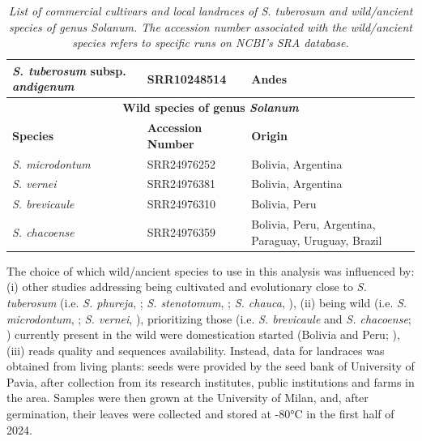 \documentclass[a4paper, 12pt]{report}
\begin{document}
\begin{table}[h!]
{\begin{tabular}{lll}
			\textit{S. tuberosum} subsp. \textit{andigenum} & SRR10248514 & Andes \\
			\midrule
			\multicolumn{3}{c}{\textbf{Wild species of genus \textit{Solanum}}} \\
			\midrule
			\textbf{Species} & \textbf{Accession Number} & \textbf{Origin} \\
			\midrule
			\textit{S. microdontum} & SRR24976252 & Bolivia, Argentina \\
			\textit{S. vernei} & SRR24976381 & Bolivia, Argentina \\
			\textit{S. brevicaule} & SRR24976310 & Bolivia, Peru \\
			\textit{S. chacoense} & SRR24976359 & Bolivia, Peru, Argentina, Paraguay, Uruguay, Brazil \\
			\bottomrule
		\end{tabular}
	}
	\caption*{\footnotesize{\textit{List of commercial cultivars and local landraces of \textit{S. tuberosum} and wild/ancient species of genus \textit{Solanum}. The accession number associated with the wild/ancient species refers to specific runs on NCBI’s SRA database.}}}
\end{table}

The choice of which wild/ancient species to use in this analysis was influenced by: (i) other studies addressing being cultivated and evolutionary close to \textit{S. tuberosum} (i.e. \textit{S. phureja}, \cite{xuGenomeSequenceAnalysis2011}; \textit{S. stenotomum}, \cite{wangStudyCultivationSeedlings2022}; \textit{S. chauca}, \cite{huamanReclassificationLandracePopulations2002}), (ii) being wild (i.e. \textit{S. microdontum}, \cite{huamanReclassificationLandracePopulations2002}; \textit{S. vernei}, \cite{spoonerSystematicsDiversityGenetics2014}), prioritizing those (i.e. \textit{S. brevicaule} and \textit{S. chacoense}; \cite{huamanReclassificationLandracePopulations2002}) currently present in the wild were domestication started (Bolivia and Peru; \cite{dejongImpactPotatoSociety2016}), (iii) reads quality and sequences availability. Instead, data for landraces was obtained from living plants: seeds were provided by the seed bank of University of Pavia, after collection from its research institutes, public institutions and farms in the area. Samples were then grown at the University of Milan, and, after germination, their leaves were collected and stored at -80°C in the first half of 2024.
\end{document}
